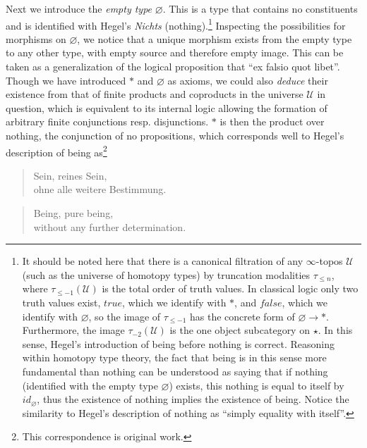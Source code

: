 \documentclass{article}
\begin{document}
Next we introduce the \emph{empty type} $\varnothing$. This is a type that contains no constituents and is 
identified with Hegel's \emph{Nichts} (nothing).\footnote{It should be noted here that there is a canonical 
filtration of any $\infty$-topos $\mathcal{U}$ (such as the universe of homotopy types) by truncation 
modalities $\tau_{\leq n}$, where $\tau_{\leq -1}(\mathcal{U})$ is the total order of truth values. In 
classical logic only two truth values exist, $true$, which we identify with $*$, and $false$, which we 
identify with $\varnothing$, so the image of $\tau_{\leq -1}$ has the concrete form of 
$\varnothing\rightarrow *$. Furthermore, the image $\tau_{-2}(\mathcal{U})$ is the one object subcategory on 
$\star$. In this sense, Hegel's introduction of being before nothing is correct. Reasoning within homotopy 
type theory, the fact that being is in this sense more fundamental than nothing can be understood as saying 
that if nothing (identified with the empty type $\varnothing$) exists, this nothing is equal to itself by 
$id_\varnothing$, thus the existence of nothing implies the existence of being. Notice the similarity to 
Hegel's description of nothing as ``simply equality with itself''.} Inspecting the possibilities for 
morphisms on $\varnothing$, we notice that a unique morphism exists from the empty type to any other type, 
with empty source and therefore empty image. This can be taken as a generalization of the logical proposition
that ``ex falsio quot libet''. \\

Though we have introduced $*$ and $\varnothing$ as axioms, we could also \emph{deduce} their existence from 
that of finite products and coproducts in the universe $\mathcal{U}$ in question, which is equivalent to its 
internal logic allowing the formation of arbitrary finite conjunctions resp. disjunctions. $*$ is then the 
product over nothing, the conjunction of no propositions, which corresponds well to Hegel's description of being 
as\footnote{This correspondence is original work.} 


\begin{quote}
    Sein, reines Sein, \\
    ohne alle weitere Bestimmung.
\end{quote}

\begin{quote}
    Being, pure being, \\ 
    without any further determination.
\end{quote}
\end{document}
